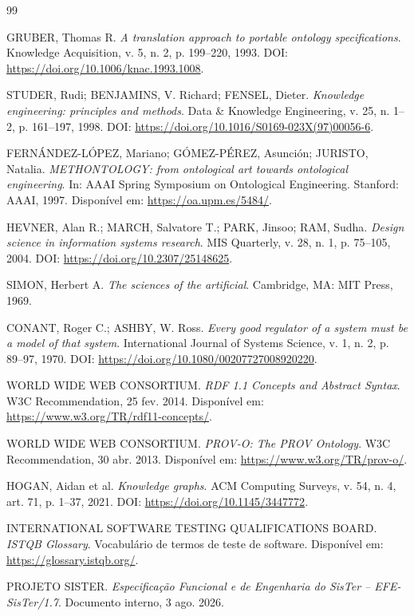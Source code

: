 \documentclass[11pt,a4paper,oneside]{article}
\begin{document}
\begin{thebibliography}{99}

GRUBER, Thomas R.
\textit{A translation approach to portable ontology specifications}.
Knowledge Acquisition, v. 5, n. 2, p. 199--220, 1993.
DOI: \url{https://doi.org/10.1006/knac.1993.1008}.

STUDER, Rudi; BENJAMINS, V. Richard; FENSEL, Dieter.
\textit{Knowledge engineering: principles and methods}.
Data \& Knowledge Engineering, v. 25, n. 1--2, p. 161--197, 1998.
DOI: \url{https://doi.org/10.1016/S0169-023X(97)00056-6}.

FERNÁNDEZ-LÓPEZ, Mariano; GÓMEZ-PÉREZ, Asunción; JURISTO, Natalia.
\textit{METHONTOLOGY: from ontological art towards ontological engineering}.
In: AAAI Spring Symposium on Ontological Engineering. Stanford: AAAI, 1997.
Disponível em: \url{https://oa.upm.es/5484/}.

HEVNER, Alan R.; MARCH, Salvatore T.; PARK, Jinsoo; RAM, Sudha.
\textit{Design science in information systems research}.
MIS Quarterly, v. 28, n. 1, p. 75--105, 2004.
DOI: \url{https://doi.org/10.2307/25148625}.

SIMON, Herbert A.
\textit{The sciences of the artificial}.
Cambridge, MA: MIT Press, 1969.

CONANT, Roger C.; ASHBY, W. Ross.
\textit{Every good regulator of a system must be a model of that system}.
International Journal of Systems Science, v. 1, n. 2, p. 89--97, 1970.
DOI: \url{https://doi.org/10.1080/00207727008920220}.

WORLD WIDE WEB CONSORTIUM.
\textit{RDF 1.1 Concepts and Abstract Syntax}.
W3C Recommendation, 25 fev. 2014.
Disponível em: \url{https://www.w3.org/TR/rdf11-concepts/}.

WORLD WIDE WEB CONSORTIUM.
\textit{PROV-O: The PROV Ontology}.
W3C Recommendation, 30 abr. 2013.
Disponível em: \url{https://www.w3.org/TR/prov-o/}.

HOGAN, Aidan et al.
\textit{Knowledge graphs}.
ACM Computing Surveys, v. 54, n. 4, art. 71, p. 1--37, 2021.
DOI: \url{https://doi.org/10.1145/3447772}.

INTERNATIONAL SOFTWARE TESTING QUALIFICATIONS BOARD.
\textit{ISTQB Glossary}.
Vocabulário de termos de teste de software.
Disponível em: \url{https://glossary.istqb.org/}.

PROJETO SISTER.
\textit{Especificação Funcional e de Engenharia do SisTer -- EFE-SisTer/1.7}.
Documento interno, 3 ago. 2026.

\end{thebibliography}
\end{document}
